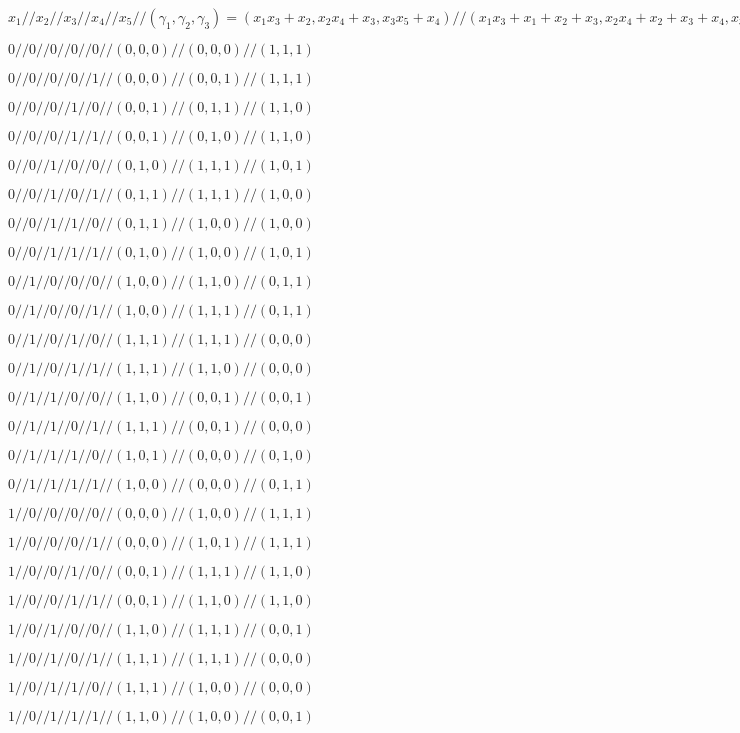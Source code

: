 \documentclass[12pt]{extarticle}
\begin{document}
$x_1 // x_2 // x_3 // x_4 // x_5 // (\gamma_1,\gamma_2,\gamma_3) = (x_1 x_3 + x_2, x_2 x_4 + x_3, x_3 x_5 + x_4) // (x_1 x_3+x_1+x_2+x_3, x_2 x_4+x_2+x_3+x_4, x_3 x_5+x_3+x_4+x_5) // (x_1 x_3+x_2+1, x_2 x_4+x_3+1, x_3 x_5+x_4+1)$

$0 // 0 // 0 // 0 // 0 // (0,0,0) // (0,0,0) // (1,1,1)$

$0 // 0 // 0 // 0 // 1 // (0,0,0) // (0,0,1) // (1,1,1)$

$0 // 0 // 0 // 1 // 0 // (0,0,1) // (0,1,1) // (1,1,0)$

$0 // 0 // 0 // 1 // 1 // (0,0,1) // (0,1,0) // (1,1,0)$

$0 // 0 // 1 // 0 // 0 // (0,1,0) // (1,1,1) // (1,0,1)$

$0 // 0 // 1 // 0 // 1 // (0,1,1) // (1,1,1) // (1,0,0)$

$0 // 0 // 1 // 1 // 0 // (0,1,1) // (1,0,0) // (1,0,0)$

$0 // 0 // 1 // 1 // 1 // (0,1,0) // (1,0,0) // (1,0,1)$

$0 // 1 // 0 // 0 // 0 // (1,0,0) // (1,1,0) // (0,1,1)$

$0 // 1 // 0 // 0 // 1 // (1,0,0) // (1,1,1) // (0,1,1)$

$0 // 1 // 0 // 1 // 0 // (1,1,1) // (1,1,1) // (0,0,0)$

$0 // 1 // 0 // 1 // 1 // (1,1,1) // (1,1,0) // (0,0,0)$

$0 // 1 // 1 // 0 // 0 // (1,1,0) // (0,0,1) // (0,0,1)$

$0 // 1 // 1 // 0 // 1 // (1,1,1) // (0,0,1) // (0,0,0)$

$0 // 1 // 1 // 1 // 0 // (1,0,1) // (0,0,0) // (0,1,0)$

$0 // 1 // 1 // 1 // 1 // (1,0,0) // (0,0,0) // (0,1,1)$

$1 // 0 // 0 // 0 // 0 // (0,0,0) // (1,0,0) // (1,1,1)$

$1 // 0 // 0 // 0 // 1 // (0,0,0) // (1,0,1) // (1,1,1)$

$1 // 0 // 0 // 1 // 0 // (0,0,1) // (1,1,1) // (1,1,0)$

$1 // 0 // 0 // 1 // 1 // (0,0,1) // (1,1,0) // (1,1,0)$

$1 // 0 // 1 // 0 // 0 // (1,1,0) // (1,1,1) // (0,0,1)$

$1 // 0 // 1 // 0 // 1 // (1,1,1) // (1,1,1) // (0,0,0)$

$1 // 0 // 1 // 1 // 0 // (1,1,1) // (1,0,0) // (0,0,0)$

$1 // 0 // 1 // 1 // 1 // (1,1,0) // (1,0,0) // (0,0,1)$
\end{document}
